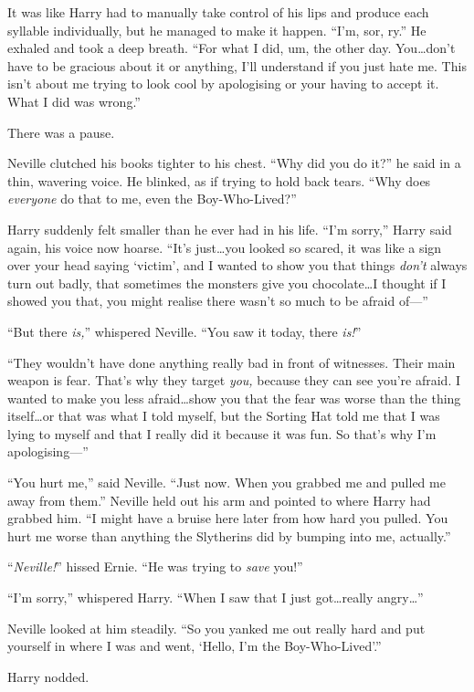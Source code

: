 It was like Harry had to manually take control of his lips and produce each syllable individually, but he managed to make it happen. “I’m, sor, ry.” He exhaled and took a deep breath. “For what I did, um, the other day. You…don’t have to be gracious about it or anything, I’ll understand if you just hate me. This isn’t about me trying to look cool by apologising or your having to accept it. What I did was wrong.”

There was a pause.

Neville clutched his books tighter to his chest. “Why did you do it?” he said in a thin, wavering voice. He blinked, as if trying to hold back tears. “Why does \emph{everyone} do that to me, even the Boy-Who-Lived?”

Harry suddenly felt smaller than he ever had in his life. “I’m sorry,” Harry said again, his voice now hoarse. “It’s just…you looked so scared, it was like a sign over your head saying ‘victim’, and I wanted to show you that things \emph{don’t} always turn out badly, that sometimes the monsters give you chocolate…I thought if I showed you that, you might realise there wasn’t so much to be afraid of—”

“But there \emph{is,}” whispered Neville. “You saw it today, there \emph{is!}”

“They wouldn’t have done anything really bad in front of witnesses. Their main weapon is fear. That’s why they target \emph{you,} because they can see you’re afraid. I wanted to make you less afraid…show you that the fear was worse than the thing itself…or that was what I told myself, but the Sorting Hat told me that I was lying to myself and that I really did it because it was fun. So that’s why I’m apologising—”

“You hurt me,” said Neville. “Just now. When you grabbed me and pulled me away from them.” Neville held out his arm and pointed to where Harry had grabbed him. “I might have a bruise here later from how hard you pulled. You hurt me worse than anything the Slytherins did by bumping into me, actually.”

“\emph{Neville!}” hissed Ernie. “He was trying to \emph{save} you!”

“I’m sorry,” whispered Harry. “When I saw that I just got…really angry…”

Neville looked at him steadily. “So you yanked me out really hard and put yourself in where I was and went, ‘Hello, I’m the Boy-Who-Lived’.”

Harry nodded.

